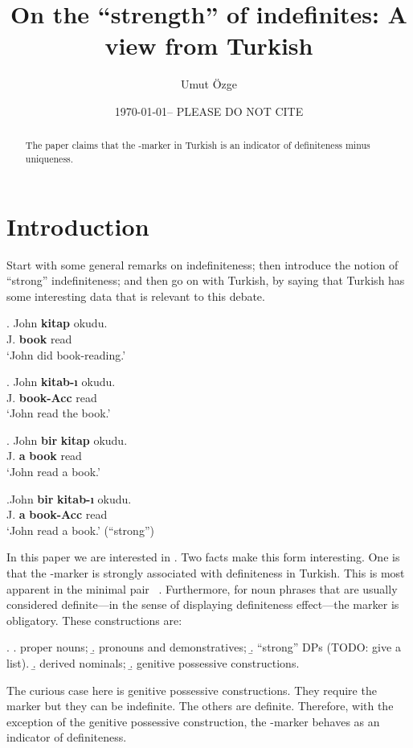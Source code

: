 \documentclass[11pt,a4paper]{article}
\title{On the ``strength'' of indefinites: A view from Turkish}
\author{Umut \"Ozge}
\date{\today -- PLEASE DO NOT CITE}
\begin{document}
\maketitle

\begin{abstract}
The paper claims that the \acc-marker in Turkish is an indicator of definiteness
minus uniqueness.
\end{abstract}

\section{Introduction}

Start with some general remarks on indefiniteness; then introduce the notion of
``strong'' indefiniteness; and then go on with Turkish, by saying that Turkish
has some interesting data that is relevant to this debate.

\exg. {\label{para-bare}John} {\bf kitap} {okudu.} \\
	{J.} {\bf book} {read}\\
`John did book-reading.'

\exg. {\label{para-def}John} {\bf kitab-{\i}}  {okudu.} \\
	{J.} {\bf book-Acc}	{read}\\
`John read the book.'

\exg. {\label{para-indef}John} {\bf bir} {\bf kitap} {okudu.}\\
	{J.} {\bf a}  {\bf book} {read}\\
`John read a book.'

\exg.{\label{para-acc}John} {\bf bir} {\bf kitab-{\i}} {okudu.}\\
	{J.} {\bf a} {\bf book-Acc} {read} \\
`John read a book.' (``strong'')

In this paper we are interested in . Two facts make this form
interesting. One is that the \acc-marker is strongly associated with
definiteness in Turkish. This is most apparent in the minimal pair
 \versus\ . Furthermore, for noun phrases that
are usually considered definite---in the sense of displaying definiteness
effect---the marker is obligatory. These constructions are:

\ex.
\a. proper nouns;
\b. pronouns and demonstratives;
\b. ``strong'' DPs (TODO: give a list).
\b. derived nominals;
\b. genitive possessive constructions.

The curious case here is genitive possessive constructions. They require the
marker but they can be indefinite. The others are definite. Therefore, with the
exception of the genitive possessive construction, the \acc-marker behaves as an
indicator of definiteness.
\end{document}

